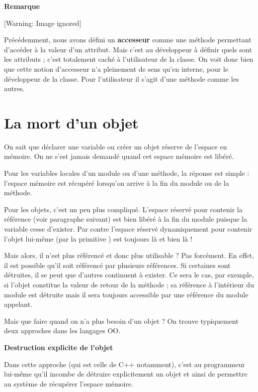 \bigskip

{\bfseries
Remarque}

\begin{center}
 [Warning: Image ignored] %

\end{center}
{
Précédemment, nous avons défini un \textbf{accesseur} comme une méthode
permettant d’accéder à la valeur d’un attribut. Mais c’est au
développeur à définir quels sont les attributs ; c’est totalement caché
à l’utilisateur de la classe. On voit donc bien que cette notion
d’accesseur n’a pleinement de sens qu’en interne, pour le développeur
de la classe. Pour l’utilisateur il s’agit d’une méthode comme les
autres.}

\section{La mort d'un objet}
{
On sait que déclarer une variable ou créer un objet réserve de l’espace
en mémoire. On ne s’est jamais demandé quand cet espace mémoire est
libéré.}

{
Pour les variables locales d’un module ou d'une
méthode, la réponse est simple : l’espace mémoire est récupéré
lorsqu’on arrive à la fin du module ou de la méthode.}

{
Pour les objets, c’est un peu plus compliqué. L’espace réservé pour
contenir la référence (voir paragraphe suivant) est bien libéré à la
fin du module puisque la variable cesse d’exister. Par contre l’espace
réservé dynamiquement pour contenir l’objet lui-même (par la primitive
) est toujours là et bien là !}

{
Mais alors, il n’est plus référencé et donc plus utilisable ? Pas
forcément. En effet, il est possible qu’il soit référencé par plusieurs
références. Si certaines sont détruites, il se peut que d’autres
continuent à exister. Ce sera le cas, par exemple, si l’objet constitue
la valeur de retour de la méthode ; sa référence à l’intérieur du
module est détruite mais il sera toujours accessible par une référence
du module appelant.}

{
Mais que faire quand on n’a plus besoin d’un objet ? On trouve
typiquement deux approches dans les langages OO.}

{\sffamily\bfseries\upshape
Destruction explicite de l’objet}

{
Dans cette approche (qui est celle de C++ notamment), c’est au
programmeur lui-même qu’il incombe de détruire explicitement un objet
et ainsi de permettre au système de récupérer l’espace mémoire. }

